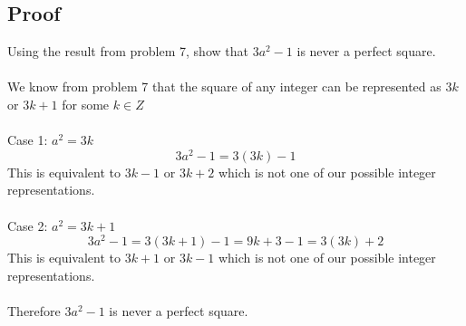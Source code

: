 \documentclass{article}
\begin{document}
\subsection{Proof}
Using the result from problem 7, show that $3a^2 - 1$ is never a perfect square.
\\\\
We know from problem 7 that the square of any integer can be represented as $3k$ or $3k+1$ for some $k \in Z$
\\\\
Case 1: $a^2 = 3k$
$$3a^2 - 1 = 3(3k) - 1$$
This is equivalent to $3k - 1$ or $3k+2$ which is not one of our possible integer representations.
\\\\
Case 2: $a^2 = 3k+1$
$$3a^2 - 1 = 3(3k+1) - 1 = 9k+3-1=3(3k) +2$$
This is equivalent to $3k + 1$ or $3k-1$ which is not one of our possible integer representations.\\\\
Therefore $3a^2 - 1$ is never a perfect square.
\end{document}
